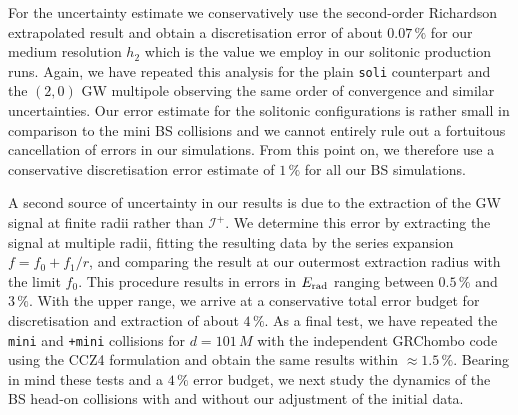 \documentclass[]{iopart}
\begin{document}
%
For the uncertainty estimate we conservatively use the second-order
Richardson extrapolated result and obtain a discretisation error
of about $0.07\,\%$ for our medium resolution $h_2$ which is the
value we employ in our solitonic production runs. Again, we have
repeated this analysis for the plain {\tt soli} counterpart and the
$(2,0)$ GW multipole observing the same order of convergence and
similar uncertainties. Our error estimate for the solitonic
configurations is rather small in comparison to the mini BS collisions
and we cannot entirely rule out a fortuitous cancellation of errors
in our simulations.  From this point on, we therefore use a
conservative discretisation error estimate of $1\,\%$ for all our
BS simulations.

A second source of uncertainty in our results is due to the extraction
of the GW signal at finite radii rather than $\mathcal{I}^+$. We
determine this error by extracting the signal at multiple radii,
fitting the resulting data by the series expansion $f=f_0+f_1/r$,
and comparing the result at our outermost extraction radius with
the limit $f_0$. This procedure results in errors in $E_{\rm rad}$
ranging between $0.5\,\%$ and $3\,\%$. With the upper range, we
arrive at a conservative total error budget for discretisation and
extraction of about $4\,\%$.  As a final test, we have repeated the
{\tt mini} and {\tt +mini} collisions for $d=101\,M$ with the
independent {\sc GRChombo} code \cite{Clough:2015sqa,Radia:2021}
using the CCZ4 formulation \cite{Alic:2011gg} and obtain the same
results within $\approx 1.5\,\%$.  Bearing in mind these tests and
a $4\,\%$ error budget, we next study the dynamics of the BS head-on
collisions with and without our adjustment of the initial data.


\end{document}
